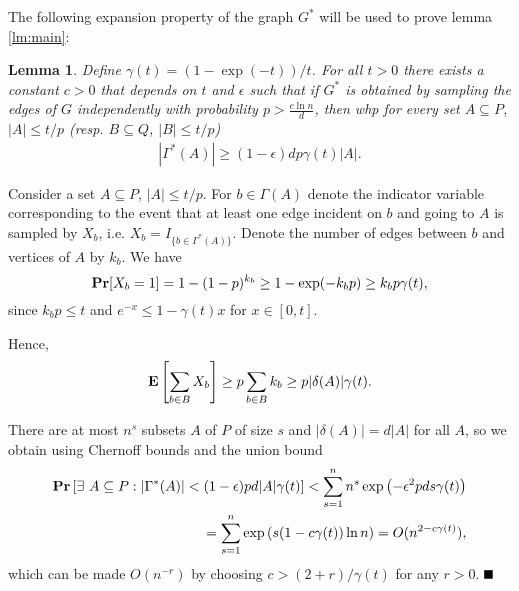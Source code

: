 \documentclass[11pt]{article}
\newcommand{\qed}{\mbox{}\hspace*{\fill}\nolinebreak\mbox{$\rule{0.6em}{0.6em}$}
}
\newcommand{\expect}{{\bf \mbox{\bf E}}}
\newcommand{\prob}{{\bf \mbox{\bf Pr}}}
\newcommand{\e}{{\epsilon}}
\newtheorem{lemma}[theorem]{Lemma}
\newenvironment{proof}{{\bf Proof:}}{$\qed$\par}
\begin{document}
The following expansion property of the graph $G^*$ will be used to prove lemma \ref{lm:main}:
\begin{lemma} \label{lm:expansion}
Define $\gamma(t)=(1-\exp(-t))/t$. For all $t>0$ there exists a constant $c>0$ that depends on $t$ and $\e$ such that if $G^*$ is obtained by sampling the edges of $G$ independently with probability $p>\frac{c\ln n}{d}$, then whp for every set $A\subseteq P$, $|A|\leq t/p$ (resp. $B\subseteq Q$, $|B|\leq t/p$) 
\begin{equation*}
\begin{split}
|\Gamma^*(A)|\geq  (1-\e) d p \gamma(t) |A|.
\end{split}
\end{equation*}
\end{lemma}
\begin{proof}
Consider a set $A\subseteq P$, $|A|\leq t/p$. For $b\in \Gamma(A)$ denote the indicator variable corresponding to the event that at least one edge incident on $b$ and going to $A$ is sampled by $X_{b}$, i.e. $X_b=I_{\lbrace b\in \Gamma^*(A)\rbrace}$. Denote the number of edges between $b$ and vertices of $A$ by $k_b$. We have 
\begin{equation*}
\prob[X_b=1]=1-(1-p)^{k_b}\geq 1-\exp(-k_b p)\geq k_b p \gamma(t),
\end{equation*}
since $k_b p\leq t$ and $e^{-x}\leq 1-\gamma(t) x$ for $x\in [0, t]$.

Hence, 
\begin{equation}  \label{xb-expect}
\expect\left[\sum_{b\in B} X_b\right]\geq p\sum_{b\in B} k_b \geq p|\delta(A)| \gamma(t).
\end{equation}

There are at most $n^s$ subsets $A$ of $P$ of size $s$ and $|\delta(A)|=d|A|$ for all $A$, so we obtain using Chernoff bounds and the union bound
\begin{equation*}
\begin{split}
\prob\left[\exists~A\subseteq P: |\Gamma^*(A)|<(1-\e)pd|A|\gamma(t)\right]<\sum_{s=1}^n n^s\exp\left(-\e^2 p d s \gamma(t)\right)\\
=\sum_{s=1}^n \exp\left(s(1-c \gamma(t))\ln n\right)=O(n^{2-c \gamma(t)}),
\end{split}
\end{equation*}
which can be made $O(n^{-r})$ by choosing $c>(2+r)/\gamma(t)$ for any $r>0$.
\end{proof}
\end{document}
